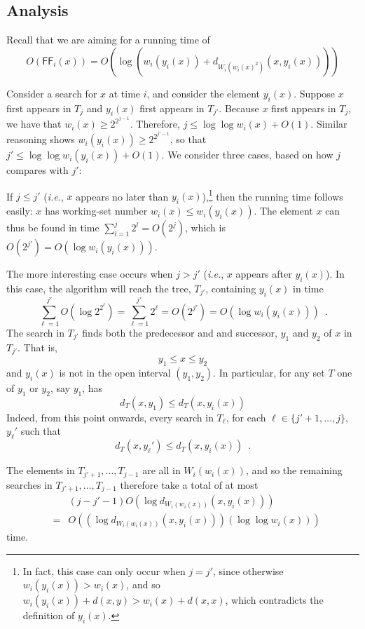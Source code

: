 \documentclass{llncs}
\newcommand{\ie}{\textsl{i.e.}}
\newcommand{\BigOh}[1]{O\!\left(#1\right)}
\newcommand{\SU}[1]{\textsf{FF}_i\!\left(#1\right)}
\begin{document}
\subsection{Analysis}
\label{section:main:analysis}

Recall that we are aiming for a running time of
\begin{displaymath}
	\BigOh{\SU{x}} = \BigOh{\log (w_i(y_i(x)) + d_{W_i(w_i(x)^2)}(x,y_i(x)))}
\end{displaymath}

Consider a search for $x$ at time $i$, and consider the element $y_i(x)$. Suppose $x$ first appears in $T_j$ and $y_i(x)$ first appears in $T_{j'}$. Because $x$ first appears in $T_j$, we have that $w_i(x) \ge 2^{2^{j-1}}$. Therefore, $j \le \log \log w_i(x) + \BigOh{1}$. Similar reasoning shows $w_i(y_i(x)) \ge 2^{2^{j'-1}}$, so that $j' \le \log \log w_i(y_i(x)) + \BigOh{1}$. We consider three cases, based on how $j$ compares with $j'$:

If $j \le j'$ (\ie, $x$ appears no later than $y_i(x)$),\footnote{In fact, this case can only occur when $j=j'$, since otherwise $w_i(y_i(x)) > w_i(x)$, and so $w_i(y_i(x)) + d(x,y) > w_i(x) + d(x,x)$, which contradicts the definition of $y_i(x)$.} then the running time follows easily: $x$ has working-set number $w_i(x) \le w_i(y_i(x))$. The element $x$ can thus be found in time $\sum_{l=1}^j 2^l = \BigOh{2^j}$, which is $\BigOh{2^{j'}} = \BigOh{\log w_i(y_i(x))}$.




The more interesting case occurs when $j > j'$ (\ie, $x$ appears after $y_i(x)$).  In this case, the algorithm will reach the tree, $T_{j'}$, containing $y_i(x)$ in time 
\[  
    \sum_{\ell=1}^{j'} \BigOh{\log 2^{2^\ell}}=\sum_{\ell=1}^{j'} 2^\ell = \BigOh{2^{j'}} = \BigOh{\log w_i(y_i(x))}
    \enspace .
\]
The search in $T_{j'}$ finds both the predecessor and and successor, $y_1$ and $y_2$ of $x$ in $T_{j'}$.  That is,
\[
       y_1 \le x \le y_2
\]
and $y_i(x)$ is not in the open interval $(y_1,y_2)$.  In particular,
for any set $T$ one of $y_1$ or $y_2$, say $y_1$, has
\[
    d_{T}(x,y_1) \le d_{T}(x,y_i(x))
\]
Indeed, from this point onwards, every search in $T_{\ell}$, for each $\ell\in\{j'+1,\ldots,j\}$, $y_\ell'$ such that
\[
    d_{T}(x,y_\ell') \le d_{T}(x,y_i(x)) \enspace .
\]

The elements in $T_{j'+1},\ldots,T_{j-1}$ are all in $W_i(w_i(x))$, and so
the remaining searches in $T_{j'+1},\ldots,T_{j-1}$ therefore take a total of at most
\begin{eqnarray*}
&&(j-j'-1)\BigOh{\log d_{W_i(w_i(x))}(x,y_i(x))}\\
&=&\BigOh{(\log d_{W_i(w_i(x))}(x,y_i(x)))(\log\log w_i(x))}
\end{eqnarray*}
time.
\end{document}
